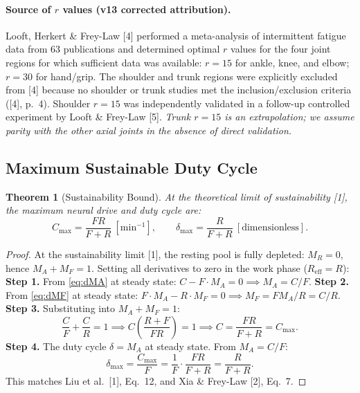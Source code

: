 \documentclass[11pt,a4paper]{article}
\newtheorem{theorem}{Theorem}[section]
\begin{document}
\paragraph{Source of $r$ values (v13 corrected attribution).} Looft,
Herkert \& Frey-Law [4] performed a meta-analysis of intermittent
fatigue data from 63 publications and determined optimal $r$ values
for the four joint regions for which sufficient data was available:
$r=15$ for ankle, knee, and elbow; $r=30$ for hand/grip. The
shoulder and trunk regions were explicitly excluded from [4] because
no shoulder or trunk studies met the inclusion/exclusion criteria
([4], p.~4). Shoulder $r=15$ was independently validated in a
follow-up controlled experiment by Looft \& Frey-Law [5]. \emph{Trunk
$r=15$ is an extrapolation; we assume parity with the other axial
joints in the absence of direct validation.}

\subsection{Maximum Sustainable Duty Cycle}

\begin{theorem}[Sustainability Bound]\label{thm:sustainability}
At the theoretical limit of sustainability [1], the maximum
neural drive and duty cycle are:
\begin{equation}\label{eq:cmax-deltamax}
C_{\max} = \frac{F R}{F + R}\ [\mathrm{min}^{-1}], \qquad
\delta_{\max} = \frac{R}{F + R}\ [\text{dimensionless}].
\end{equation}
\end{theorem}

\begin{proof}
At the sustainability limit [1], the resting pool is fully depleted:
$M_R = 0$, hence $M_A + M_F = 1$. Setting all derivatives to zero in
the work phase ($R_{\mathrm{eff}} = R$):
\textbf{Step 1.} From \eqref{eq:dMA} at steady state:
$C - F \cdot M_A = 0 \implies M_A = C/F$.
\textbf{Step 2.} From \eqref{eq:dMF} at steady state:
$F \cdot M_A - R \cdot M_F = 0 \implies M_F = F M_A / R = C/R$.
\textbf{Step 3.} Substituting into $M_A + M_F = 1$:
\[
\frac{C}{F} + \frac{C}{R} = 1 \implies C\left(\frac{R + F}{FR}\right) = 1
\implies C = \frac{FR}{F+R} = C_{\max}.
\]
\textbf{Step 4.} The duty cycle $\delta = M_A$ at steady state. From
$M_A = C/F$:
\[
\delta_{\max} = \frac{C_{\max}}{F} = \frac{1}{F} \cdot \frac{FR}{F+R} = \frac{R}{F+R}.
\]
This matches Liu et al.\ [1], Eq.~12, and Xia \& Frey-Law [2], Eq.~7.
\end{proof}
\end{document}
